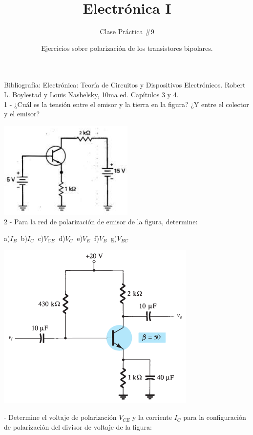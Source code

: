 \documentclass[10pt,letterpaper]{article}
\author{Clase Práctica $\#$9}
\title{Electrónica I}
\date{Ejercicios sobre polarización de los transistores bipolares.}
\begin{document}
	\maketitle

Bibliografía: Electrónica: Teoría de Circuitos y Dispositivos Electrónicos. Robert L. Boylestad y Louis Nashelsky, 10ma ed. Capítulos 3 y 4.
\\
	
	1 - ¿Cuál es la tensión entre el emisor y la tierra en la figura? ¿Y entre el colector y el emisor?
	
	\includegraphics[scale=0.7]{c1.png} \\

	2 - Para la red de polarización de emisor de la figura, determine:
	
		a)$I_B \:$ 	b)$I_C \:$ c)$V_{CE}\:$ d)$V_{C}\:$ e)$V_{E}\:$ f)$V_{B}\:$ g)$V_{BC}\:$
		
		\includegraphics[scale=0.7]{c2.png}
	
	 - Determine el voltaje de polarización $V_{CE}$ y la corriente $I_{C}$ para la configuración de polarización del divisor de voltaje de la figura:
	
\end{document}
